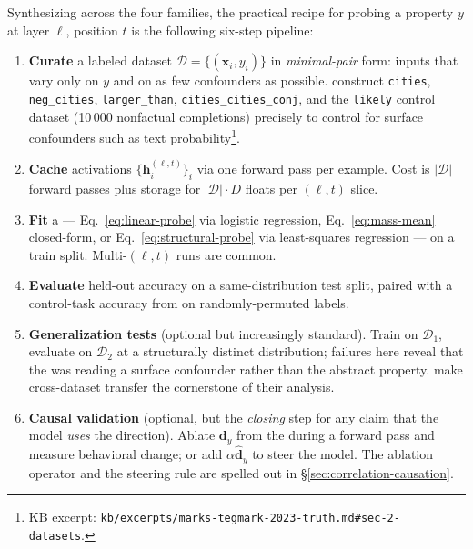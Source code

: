 Synthesizing across the four  families, the practical recipe for
probing a property $y$ at layer $\ell$, position $t$ is the following
six-step pipeline:
\begin{enumerate}
  \item \textbf{Curate} a labeled dataset
    $\mathcal{D} = \{(\mathbf{x}_i, y_i)\}$ in \emph{minimal-pair} form:
    inputs that vary only on $y$ and on as few confounders as possible.
    \citet[\S 2]{marks-tegmark-2023-truth} construct
    \texttt{cities}, \texttt{neg\_cities}, \texttt{larger\_than},
    \texttt{cities\_cities\_conj}, and the \texttt{likely} control
    dataset (10\,000 nonfactual completions) precisely to control for
    surface confounders such as text probability\footnote{KB excerpt:
    \texttt{kb/excerpts/marks-tegmark-2023-truth.md\#sec-2-datasets}.}.
  \item \textbf{Cache} activations $\{\mathbf{h}^{(\ell, t)}_i\}_i$ via
    one forward pass per example. Cost is $|\mathcal{D}|$ forward
    passes plus storage for $|\mathcal{D}| \cdot D$ floats per
    $(\ell, t)$ slice.
  \item \textbf{Fit} a  — Eq.~\eqref{eq:linear-probe} via logistic
    regression, Eq.~\eqref{eq:mass-mean} closed-form, or
    Eq.~\eqref{eq:structural-probe} via least-squares regression — on a
    train split. Multi-$(\ell, t)$ runs are common.
  \item \textbf{Evaluate} held-out accuracy on a same-distribution test
    split, paired with a control-task accuracy from
    \citet{hewitt2019-control-tasks} on randomly-permuted labels.
  \item \textbf{Generalization tests} (optional but increasingly
    standard). Train on $\mathcal{D}_1$, evaluate on $\mathcal{D}_2$ at
    a structurally distinct distribution; failures here reveal that
    the  was reading a surface confounder rather than the abstract
    property. \citet[\S 1, \S 4]{marks-tegmark-2023-truth} make
    cross-dataset transfer the cornerstone of their analysis.
  \item \textbf{Causal validation} (optional, but the \emph{closing}
    step for any claim that the model \emph{uses} the  direction).
    Ablate $\mathbf{d}_y$ from the  during a forward pass
    and measure behavioral change; or add $\alpha \hat{\mathbf{d}}_y$
    to steer the model. The ablation operator and the steering rule
    are spelled out in \S\ref{sec:correlation-causation}.
\end{enumerate}

